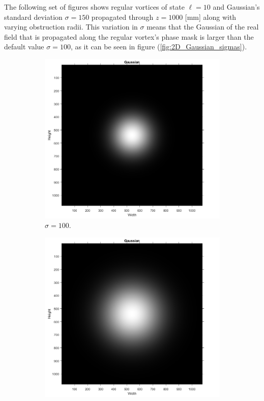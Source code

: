 The following set of figures shows regular vortices of state $\ell = 10$ and Gaussian's standard deviation $\sigma = 150$ propagated through $z = 1000$ [mm] along with varying obstruction radii. This variation in $\sigma$ means that the Gaussian of the real field that is propagated along the regular vortex's phase mask is larger than the default value $\sigma = 100$, as it can be seen in figure (\ref{fig:2D_Gaussian_sigmas}). 

\begin{figure}[htbp]
    \centering
    \begin{subfigure}[b]{0.45\textwidth}
        \centering
        \includegraphics[width=\textwidth]{images/Appendices/Additional_Results/Sigma_150/sigma=100.png}
        \caption{$\sigma = 100$.}
    \end{subfigure}
    \hfill
    \begin{subfigure}[b]{0.45\textwidth}
        \centering
        \includegraphics[width=\textwidth]{images/Appendices/Additional_Results/Sigma_150/sigma=150.png}

\end{subfigure}
\end{figure}
